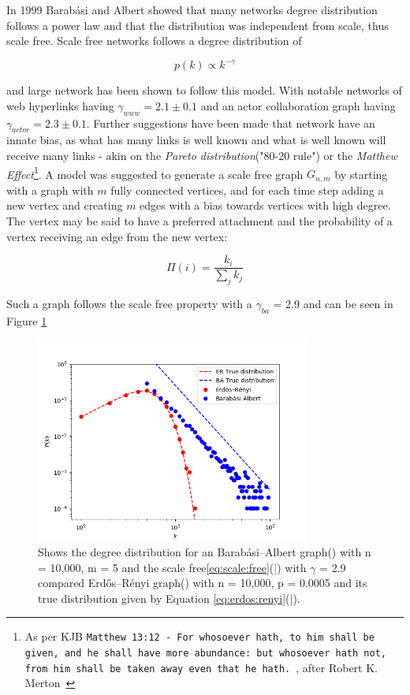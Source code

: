 In 1999 Barabási and Albert showed that many networks degree distribution follows a power law and that the distribution was independent from scale, thus scale free\cite{barabasi:albert:emergent:scaling}. Scale free networks follows a degree distribution of

\begin{equation}
	 p(k) \propto k^{-\gamma} 
	\label{eq:scale:free}
\end{equation}

and large network has been shown to follow this model. With notable networks of web hyperlinks having $\gamma_{www} = 2.1\pm 0.1$ and an actor collaboration graph having $\gamma_{actor} = 2.3\pm0.1$. Further suggestions have been made that network have an innate bias, as what has many links is well known and what is well known will receive many links - akin on the \textit{Pareto distribution}("80-20 rule") or the \textit{Matthew Effect}\footnote{As per KJB \texttt{Matthew 13:12 - For whosoever hath, to him shall be given, and he shall have more abundance: but whosoever hath not, from him shall be taken away even that he hath.}~\cite{king:james:bible}, after Robert K. Merton~\cite{merton:matthew:effect} }. 
A model was suggested to generate a scale free graph $G_{n, m}$ by starting with a graph with $m$ fully connected vertices, and for each time step adding a new vertex and creating $m$ edges with a bias towards vertices with high degree. The vertex may be said to have a preferred attachment and the probability of a vertex receiving an edge from the new vertex:

\[ \Pi(i) = \dfrac{k_i}{\sum_{j}^{}k_j}  \]

Such a graph follows the scale free property with a $\gamma_{ba}$ = 2.9 and can be seen in Figure \ref{fig:scale_free}
\newpage
\begin{figure}[!htb]
	\hspace*{-0.5cm} 
	\centering
	\includegraphics[width=9cm]{images/scale_free_degree_distribution.png}
	\caption{Shows the degree distribution for an Barabási–Albert graph(\tikzcircle[red, fill=red]{2pt}) with n = 10,000, m = 5 and the scale free\ref{eq:scale:free}(\textcolor{red}{|}) with $\gamma$ = 2.9 compared Erdős–Rényi graph(\tikzcircle[blue, fill=blue]{2pt}) with n = 10,000, p = 0.0005 and its true distribution given by Equation \ref{eq:erdos:renyi}(\textcolor{blue}{|}).
	}
	\label{fig:scale_free}
	\hspace*{2mm} 
\end{figure}

